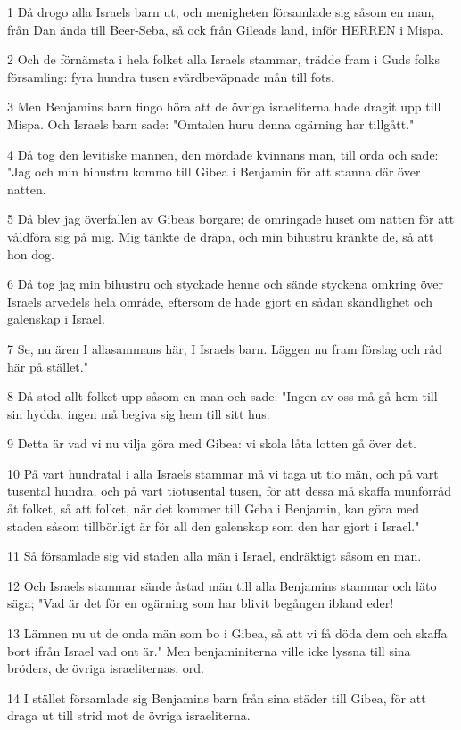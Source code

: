 \par 1 Då drogo alla Israels barn ut, och menigheten församlade sig såsom en man, från Dan ända till Beer-Seba, så ock från Gileads land, inför HERREN i Mispa.
\par 2 Och de förnämsta i hela folket alla Israels stammar, trädde fram i Guds folks församling: fyra hundra tusen svärdbeväpnade mån till fots.
\par 3 Men Benjamins barn fingo höra att de övriga israeliterna hade dragit upp till Mispa. Och Israels barn sade: "Omtalen huru denna ogärning har tillgått."
\par 4 Då tog den levitiske mannen, den mördade kvinnans man, till orda och sade: "Jag och min bihustru kommo till Gibea i Benjamin för att stanna där över natten.
\par 5 Då blev jag överfallen av Gibeas borgare; de omringade huset om natten för att våldföra sig på mig. Mig tänkte de dräpa, och min bihustru kränkte de, så att hon dog.
\par 6 Då tog jag min bihustru och styckade henne och sände styckena omkring över Israels arvedels hela område, eftersom de hade gjort en sådan skändlighet och galenskap i Israel.
\par 7 Se, nu ären I allasammans här, I Israels barn. Läggen nu fram förslag och råd här på stället."
\par 8 Då stod allt folket upp såsom en man och sade: "Ingen av oss må gå hem till sin hydda, ingen må begiva sig hem till sitt hus.
\par 9 Detta är vad vi nu vilja göra med Gibea: vi skola låta lotten gå över det.
\par 10 På vart hundratal i alla Israels stammar må vi taga ut tio män, och på vart tusental hundra, och på vart tiotusental tusen, för att dessa må skaffa munförråd åt folket, så att folket, när det kommer till Geba i Benjamin, kan göra med staden såsom tillbörligt är för all den galenskap som den har gjort i Israel."
\par 11 Så församlade sig vid staden alla män i Israel, endräktigt såsom en man.
\par 12 Och Israels stammar sände åstad män till alla Benjamins stammar och läto säga; "Vad är det för en ogärning som har blivit begången ibland eder!
\par 13 Lämnen nu ut de onda män som bo i Gibea, så att vi få döda dem och skaffa bort ifrån Israel vad ont är." Men benjaminiterna ville icke lyssna till sina bröders, de övriga israeliternas, ord.
\par 14 I stället församlade sig Benjamins barn från sina städer till Gibea, för att draga ut till strid mot de övriga israeliterna.
